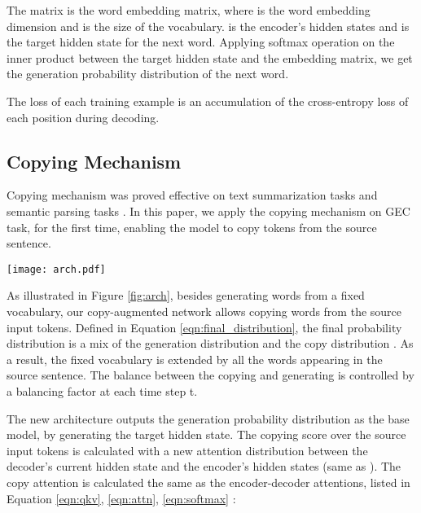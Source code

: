 \documentclass[11pt,a4paper]{article}
\begin{document}
\vspace{-3pt}


\vspace{-3pt}


The matrix  is the word embedding matrix, where  is the word embedding dimension and  is the size of the vocabulary.  is the encoder's hidden states and  is the target hidden state for the next word. Applying softmax operation on the inner product between the target hidden state and the embedding matrix, we get the generation probability distribution of the next word. 



The loss  of each training example is an accumulation of the cross-entropy loss of each position during decoding.


\subsection{Copying Mechanism}
Copying mechanism was proved effective on text summarization tasks \cite{see2017get,gu2016incorporating} and semantic parsing tasks \cite{jia2016data}. In this paper, we apply the copying mechanism on GEC task, for the first time, enabling the model to copy tokens from the source sentence. 


\begin{figure*}
\begin{center}
\texttt{[image: arch.pdf]}
\caption{Copy-Augmented Architecture.}
\label{fig:arch}
\end{center}
\end{figure*}

As illustrated in Figure \ref{fig:arch}, besides generating words from a fixed vocabulary, our copy-augmented network allows copying words from the source input tokens.  Defined in Equation \ref{eqn:final_distribution}, the final probability distribution  is a mix of the generation distribution  and the copy distribution . As a result, the fixed vocabulary is extended by all the words appearing in the source sentence. The balance between the copying and generating is controlled by a balancing factor  at each time step t.




The new architecture outputs the generation probability distribution as the base model, by generating the target hidden state. The copying score over the source input tokens is calculated with a new attention distribution between the decoder's current hidden state  and the encoder's hidden states  (same as ). The copy attention is calculated the same as the encoder-decoder attentions, listed in Equation \ref{eqn:qkv}, \ref{eqn:attn}, \ref{eqn:softmax} :
\end{document}
